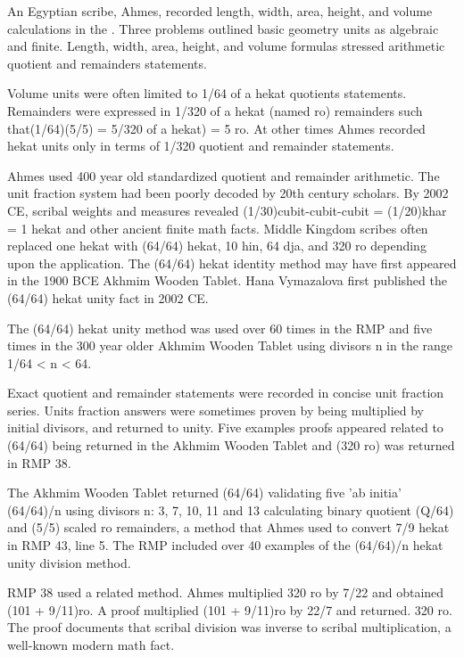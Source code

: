 \documentclass[12pt]{article}
\begin{document}
An Egyptian scribe, Ahmes, recorded length, width, area, height, and volume calculations in the . Three problems  outlined basic geometry units as algebraic and finite. Length, width, area, height, and volume formulas stressed arithmetic quotient and remainders statements. 

Volume units were often limited to 1/64 of a hekat quotients statements. Remainders were expressed in 1/320 of a hekat (named ro) remainders such that(1/64)(5/5) = 5/320 of a hekat) = 5 ro.  At other times Ahmes recorded hekat units only in terms of 1/320 quotient and remainder statements.

Ahmes used 400 year old standardized quotient and remainder arithmetic. The unit fraction system had been poorly decoded by 20th century scholars. By 2002 CE, scribal weights and measures revealed (1/30)cubit-cubit-cubit = (1/20)khar = 1 hekat and other ancient finite math facts. Middle Kingdom scribes often replaced one hekat with (64/64) hekat, 10 hin, 64 dja, and 320 ro depending upon the application. The (64/64) hekat identity method may have first appeared in the 1900 BCE Akhmim Wooden Tablet. Hana Vymazalova first published the (64/64) hekat unity fact in 2002 CE.

The (64/64) hekat unity method was used over 60 times in the RMP and five times in the 300 year older Akhmim Wooden Tablet using divisors n in the range 1/64 < n < 64.

Exact quotient and remainder statements were recorded in concise unit fraction series. Units fraction answers were sometimes proven by being multiplied by initial divisors, and returned to unity. Five examples proofs appeared related to (64/64) being returned in the Akhmim Wooden Tablet and (320 ro) was returned in RMP 38. 

The Akhmim Wooden Tablet returned (64/64) validating five 'ab initia' (64/64)/n using divisors n: 3, 7, 10, 11 and 13 calculating binary quotient (Q/64) and (5/5) scaled ro remainders, a method that Ahmes used to convert 7/9 hekat in RMP 43, line 5. The RMP included over 40 examples of the (64/64)/n hekat unity division method. 

RMP 38 used a related method. Ahmes multiplied 320 ro by 7/22 and obtained (101 + 9/11)ro. A proof multiplied (101 + 9/11)ro by 22/7 and returned. 320 ro. The proof documents that scribal division was inverse to scribal multiplication, a well-known modern math fact.  
\end{document}
